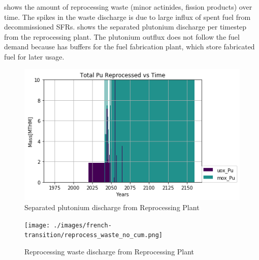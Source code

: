  shows the amount of reprocessing waste
(minor actinides, fission products) over time. The spikes in the 
waste discharge is due to large influx of spent fuel from
decommissioned \glspl{SFR}. shows the separated plutonium discharge
per timestep from the reprocessing plant. The plutonium outflux
does not follow the fuel demand because \Cyclus has buffers for
the fuel fabrication plant, which store fabricated fuel for 
later usage. 

\begin{figure}[htbp!]
	\begin{center}
		\includegraphics[scale=0.7]{./images/french-transition/pu.png}
	\end{center}
	\caption{Separated plutonium discharge from Reprocessing Plant}
	\label{fig:pu_no_cum}
\end{figure}


\begin{figure}[htbp!]
	\begin{center}
		\texttt{[image: ./images/french-transition/reprocess\_waste\_no\_cum.png]}
	\end{center}
	\caption{Reprocessing waste discharge from Reprocessing Plant}
	\label{fig:reprocess_waste}
\end{figure}


\begin{table}[h]
	\centering
		\caption {\gls{SFR} Simulation Results}
		\label{tab:sfr_sim_result}
\end {table}
